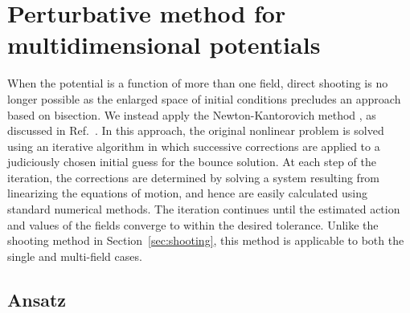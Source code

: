 \documentclass[final,3p,11pt,pdflatex]{elsarticle}
\newcommand{\secref}[1]{Section~\ref{#1}}
\newcommand{\refcite}[1]{Ref.~\cite{#1}}
\begin{document}
\section{Perturbative method for multidimensional potentials}
\label{sec:perturbative_algorithm}

When the potential is a function of more than one field, direct shooting is
no longer possible as the enlarged space of initial conditions precludes an
approach based on bisection.  We instead apply the Newton-Kantorovich method
\cite{NKtheorem}, as discussed in \refcite{Akula:2016gpl}.  In this approach,
the original nonlinear problem is solved using an iterative algorithm in which
successive corrections are applied to a judiciously chosen initial guess for
the bounce solution.  At each step of the iteration, the corrections are
determined by solving a system resulting from linearizing the equations of
motion, and hence are easily calculated using standard numerical methods.
The iteration continues until the estimated action and values of the fields
converge to within the desired tolerance.  Unlike the shooting method in
\secref{sec:shooting}, this method is applicable to both the single and
multi-field cases.

\subsection{Ansatz}\label{sec:ansatz}
\end{document}
